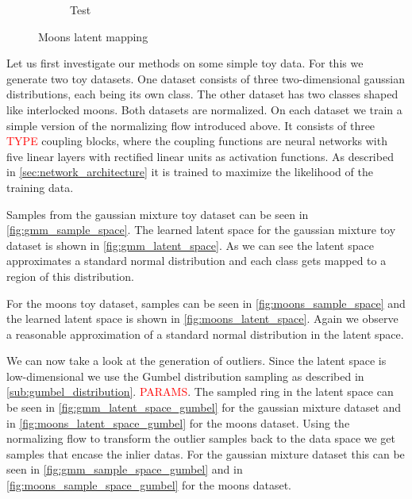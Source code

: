 \begin{figure}[htpb]
\begin{subfigure}[]{0.4\textwidth}
        \caption{Test}
        \label{fig:moons_latent_space_gumbel}
    \end{subfigure}
    \caption{Moons latent mapping}%
    \label{fig:latent_moons}
\end{figure}

Let us first investigate our methods on some simple toy data. For this we
generate two toy datasets. One dataset consists of three two-dimensional
gaussian distributions, each being its own class. The other dataset has two
classes shaped like interlocked moons. Both datasets are normalized. On each
dataset we train a simple version of the normalizing flow introduced above. It
consists of three \textcolor{red}{TYPE} coupling blocks, where the coupling
functions are neural networks with five linear layers with rectified linear
units as activation functions. As described in
\autoref{sec:network_architecture} it is trained to maximize the likelihood of
the training data.

Samples from the gaussian mixture toy dataset can be seen in
\autoref{fig:gmm_sample_space}. The learned latent space for the gaussian
mixture toy dataset is shown in \autoref{fig:gmm_latent_space}. As we can see
the latent space approximates a standard normal distribution and each class
gets mapped to a region of this distribution.

For the moons toy dataset, samples can be seen in
\autoref{fig:moons_sample_space} and the learned latent space is shown in
\autoref{fig:moons_latent_space}. Again we observe a reasonable approximation
of a standard normal distribution in the latent space.

We can now take a look at the generation of outliers. Since the latent space is
low-dimensional we use the Gumbel distribution sampling as described in
\autoref{sub:gumbel_distribution}. \textcolor{red}{PARAMS}. The sampled ring in
the latent space can be seen in \autoref{fig:gmm_latent_space_gumbel} for the
gaussian mixture dataset and in \autoref{fig:moons_latent_space_gumbel} for the
moons dataset. Using the normalizing flow to transform the outlier samples back
to the data space we get samples that encase the inlier datas. For the gaussian
mixture dataset this can be seen in \autoref{fig:gmm_sample_space_gumbel} and
in \autoref{fig:moons_sample_space_gumbel} for the moons dataset.

